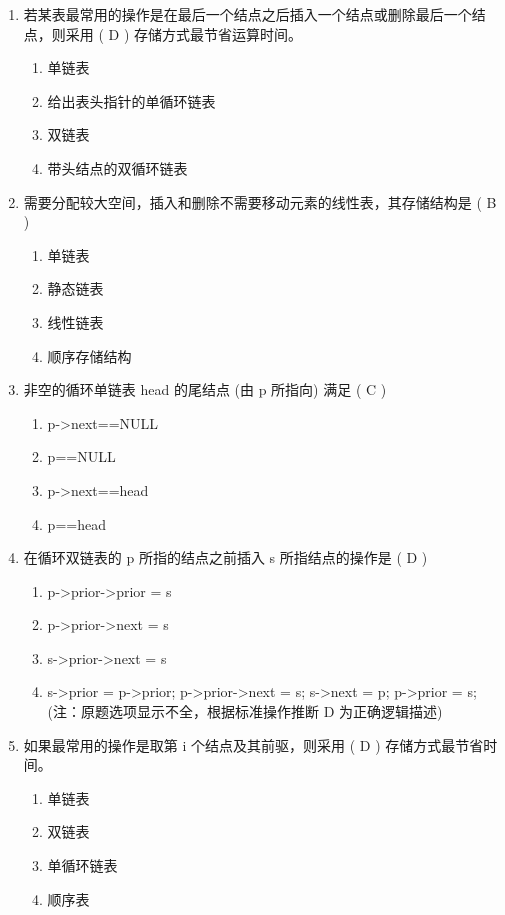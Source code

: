 \documentclass[12pt, a4paper]{article}
\begin{document}
\begin{enumerate}[label=\arabic*.]
    \item 若某表最常用的操作是在最后一个结点之后插入一个结点或删除最后一个结点，则采用 ( D ) 存储方式最节省运算时间。
    \begin{enumerate}
        \item 单链表
        \item 给出表头指针的单循环链表
        \item 双链表
        \item 带头结点的双循环链表
    \end{enumerate}

    \item 需要分配较大空间，插入和删除不需要移动元素的线性表，其存储结构是 ( B )
    \begin{enumerate}
        \item 单链表
        \item 静态链表
        \item 线性链表
        \item 顺序存储结构
    \end{enumerate}

    \item 非空的循环单链表 head 的尾结点 (由 p 所指向) 满足 ( C )
    \begin{enumerate}
        \item p->next==NULL
        \item p==NULL
        \item p->next==head
        \item p==head
    \end{enumerate}

    \item 在循环双链表的 p 所指的结点之前插入 s 所指结点的操作是 ( D )
    \begin{enumerate}
        \item p->prior->prior = s
        \item p->prior->next = s
        \item s->prior->next = s
        \item s->prior = p->prior; p->prior->next = s; s->next = p; p->prior = s; (注：原题选项显示不全，根据标准操作推断 D 为正确逻辑描述)
    \end{enumerate}

    \item 如果最常用的操作是取第 i 个结点及其前驱，则采用 ( D ) 存储方式最节省时间。
    \begin{enumerate}
        \item 单链表
        \item 双链表
        \item 单循环链表
        \item 顺序表
    \end{enumerate}


\end{enumerate}
\end{document}
